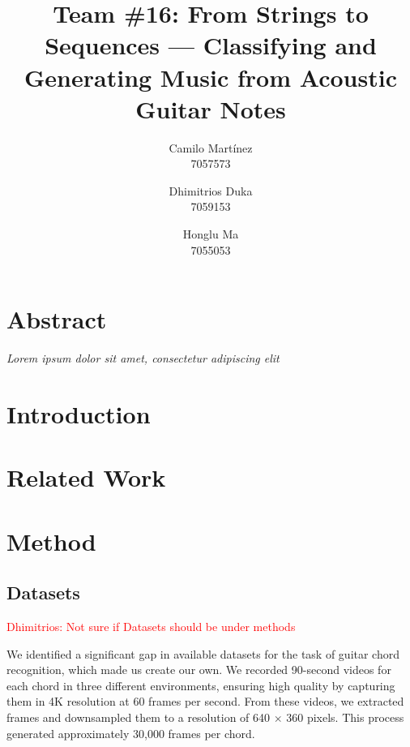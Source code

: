 \documentclass[10pt,twocolumn,letterpaper]{article}
\begin{document}
\newcommand{\dhimitrios}[1]{\textcolor{red}{Dhimitrios: #1}}

\title{Team \#16: From Strings to Sequences --- Classifying and Generating Music from Acoustic Guitar Notes}


\author{
  Camilo Martínez\\
  7057573\\
  \and
  Dhimitrios Duka\\
  7059153\\
  \and
  Honglu Ma\\
  7055053\\
}
\maketitle

\section{Abstract}
\emph{Lorem ipsum dolor sit amet, consectetur adipiscing elit}

\section{Introduction}

\section{Related Work}  

\section{Method}

\subsection{Datasets}
\dhimitrios{Not sure if Datasets should be under methods}

We identified a significant gap in available datasets for the task of guitar chord recognition, which made us create our own. We recorded 90-second videos for each chord in three different environments, ensuring high quality by capturing them in 4K resolution at 60 frames per second. From these videos, we extracted frames and downsampled them to a resolution of 640 $\times$ 360 pixels. This process generated approximately 30,000 frames per chord.
\end{document}
